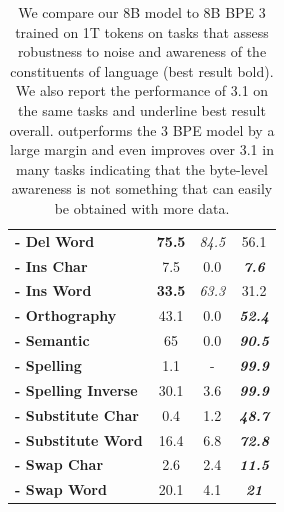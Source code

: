 \begin{table}[t]
\begin{tabular}{@{}lccc@{}}
        \hspace{0.5cm}\textbf{- Del Word}         & \textbf{75.5} &	\emph{84.5} & 56.1 \\
        \hspace{0.5cm}\textbf{- Ins Char}         & 7.5	          & 0.0 & \emph{\textbf{7.6}} \\
        \hspace{0.5cm}\textbf{- Ins Word}         & \textbf{33.5} & \emph{63.3}	& 31.2 \\
        \hspace{0.5cm}\textbf{- Orthography}      & 43.1	      & 0.0 & \emph{\textbf{52.4}} \\
        \hspace{0.5cm}\textbf{- Semantic}         & 65	          & 0.0 & \emph{\textbf{90.5}} \\
        \hspace{0.5cm}\textbf{- Spelling}         & 1.1	          & - & \emph{\textbf{99.9}} \\
        \hspace{0.5cm}\textbf{- Spelling Inverse} & 30.1	      & 3.6 & \emph{\textbf{99.9}} \\
        \hspace{0.5cm}\textbf{- Substitute Char}  & 0.4	          & 1.2 & \emph{\textbf{48.7}} \\
        \hspace{0.5cm}\textbf{- Substitute Word}  & 16.4	      & 6.8 & \emph{\textbf{72.8}} \\
        \hspace{0.5cm}\textbf{- Swap Char}        & 2.6	          & 2.4 & \emph{\textbf{11.5}} \\
        \hspace{0.5cm}\textbf{- Swap Word}        & 20.1	      & 4.1 & \emph{\textbf{21}} \\

\bottomrule
\end{tabular}
\caption{We compare our 8B \model{} model to 8B BPE \llama{} 3 trained on 1T tokens on tasks that assess robustness to noise and awareness of the constituents of language  (best result bold). We also report the performance of \llama{} 3.1 on the same tasks and underline best result overall. \model{} outperforms the \llama{} 3 BPE model by a large margin and even improves over \llama{} 3.1 in many tasks indicating that the byte-level awareness is not something that can easily be obtained with more data.}
\label{tab:char_tasks}
\end{table}